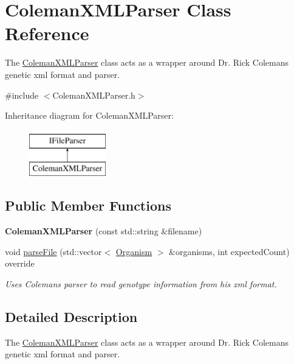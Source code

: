 \hypertarget{class_coleman_x_m_l_parser}{}\section{Coleman\+X\+M\+L\+Parser Class Reference}
\label{class_coleman_x_m_l_parser}


The \hyperlink{class_coleman_x_m_l_parser}{Coleman\+X\+M\+L\+Parser} class acts as a wrapper around Dr. Rick Coleman\textquotesingle{}s genetic xml format and parser.  




{\ttfamily \#include $<$Coleman\+X\+M\+L\+Parser.\+h$>$}

Inheritance diagram for Coleman\+X\+M\+L\+Parser\+:\begin{figure}[H]
\begin{center}
\leavevmode
\includegraphics[height=2.000000cm]{class_coleman_x_m_l_parser}
\end{center}
\end{figure}
\subsection*{Public Member Functions}
\begin{DoxyCompactItemize}
\item 
{\bfseries Coleman\+X\+M\+L\+Parser} (const std\+::string \&filename)\hypertarget{class_coleman_x_m_l_parser_a3daa7719b45ab65f0b022c869055f104}{}\label{class_coleman_x_m_l_parser_a3daa7719b45ab65f0b022c869055f104}

\item 
void \hyperlink{class_coleman_x_m_l_parser_a8f2949b991e5922734277a56f81c9a77}{parse\+File} (std\+::vector$<$ \hyperlink{class_organism}{Organism} $>$ \&organisms, int expected\+Count) override
\begin{DoxyCompactList}\small\item\em Uses Coleman\textquotesingle{}s parser to read genotype information from his xml format. \end{DoxyCompactList}\end{DoxyCompactItemize}


\subsection{Detailed Description}
The \hyperlink{class_coleman_x_m_l_parser}{Coleman\+X\+M\+L\+Parser} class acts as a wrapper around Dr. Rick Coleman\textquotesingle{}s genetic xml format and parser. 

